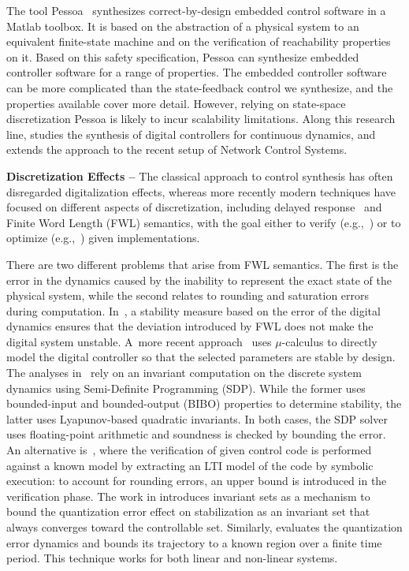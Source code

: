 \documentclass[sigconf]{llncs}
\begin{document}
The tool Pessoa~\cite{mazo2010pessoa} synthesizes correct-by-design embedded
control software in a Matlab toolbox.  It is based on the abstraction of a
physical system to an equivalent finite-state machine and on the
verification of reachability properties on it.  Based on this safety
specification, \mbox{Pessoa} can synthesize embedded controller software for
a range of properties.  The embedded controller software can be more
complicated than the state-feedback control we synthesize, and the
properties available cover more detail.  However, relying on state-space
discretization \mbox{Pessoa} is likely to incur scalability limitations. 
Along this research line, \cite{Anta2010,liu16} studies the synthesis of
digital controllers for continuous dynamics, and \cite{zamani2014} extends
the approach to the recent setup of Network Control Systems.

\noindent\textbf{Discretization Effects --}
The classical approach to control synthesis has often disregarded
digitalization effects, whereas more recently modern techniques have focused
on different aspects of discretization, including delayed
response~\cite{Duggirala2015} and Finite Word Length (FWL) semantics, with
the goal either to verify (e.g.,~\cite{daes20161}) or to optimize
(e.g.,~\cite{oudjida2014design}) given implementations.

There are two different problems that arise from FWL semantics.  The first
is the error in the dynamics caused by the inability to represent the exact
state of the physical system, while the second relates to rounding and
saturation errors during computation.  In~\cite{fialho1994stability}, a
stability measure based on the error of the digital dynamics ensures that
the deviation introduced by FWL does not make the digital system unstable. 
A~more recent approach~\cite{DBLP:journals/automatica/WuLCC09} uses
$\mu$-calculus to directly model the digital controller so that the selected
parameters are stable by design.  The analyses
in~\cite{DBLP:conf/hybrid/RouxJG15,DBLP:conf/hybrid/WangGRJF16} rely on an
invariant computation on the discrete system dynamics using Semi-Definite
Programming (SDP).  While the former uses bounded-input and bounded-output
(BIBO) properties to determine stability, the latter uses Lyapunov-based
quadratic invariants.  In both cases, the SDP solver uses floating-point
arithmetic and soundness is checked by bounding the error.  An alternative
is~\cite{park2016scalable}, where the verification of given control code is
performed against a known model by extracting an LTI model of the code by
symbolic execution: to account for rounding errors, an upper bound is
introduced in the verification phase.  The work in
\cite{picasso2003stabilization} introduces invariant sets as a mechanism to
bound the quantization error effect on stabilization as an invariant set
that always converges toward the controllable set.  Similarly,
\cite{liberzon2003hybrid} evaluates the quantization error dynamics and
bounds its trajectory to a known region over a finite time period.  This
technique works for both linear and non-linear systems.
\end{document}
